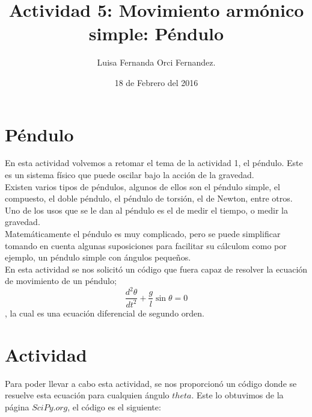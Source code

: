 \documentclass[12pt,letterpaper]{article}
\begin{document}
\title{Actividad 5:  Movimiento armónico simple: Péndulo}
\author{Luisa Fernanda Orci Fernandez.}
\date{18 de Febrero del 2016}

\maketitle


\section*{Péndulo}
En esta actividad volvemos a retomar el tema de la actividad 1, el péndulo. Este es un sistema físico que puede oscilar bajo la acción de la gravedad. \\ 
Existen varios tipos de péndulos, algunos de ellos son el péndulo simple, el compuesto, el doble péndulo, el péndulo de torsión, el de Newton, entre otros. Uno de los usos que se le dan al péndulo es el de medir el tiempo, o medir la gravedad. \\

Matemáticamente el péndulo es muy complicado, pero se puede simplificar tomando en cuenta algunas suposiciones para facilitar su cálculom como por ejemplo, un péndulo simple con ángulos pequeños. \\

En esta actividad se nos solicitó un código que fuera capaz de resolver la ecuación de movimiento de un péndulo; $$ \frac{d^2\theta}{dt^2} + \frac{g}{l}\sin\theta = 0  $$, la cual es una ecuación diferencial de segundo orden.

\section*{Actividad}
Para poder llevar a cabo esta actividad, se nos proporcionó un código donde se resuelve esta ecuación para cualquien ángulo $theta$. Este lo obtuvimos de la página $ SciPy.org $, el código es el siguiente: 
\end{document}
